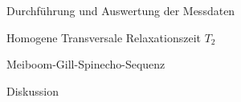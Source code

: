 \documentclass[pdftex, a4paper,11pt, twoside, ngerman]{report}
\begin{document}
\begin{chapter}{Durchführung und Auswertung der Messdaten}
\begin{section}{
        Homogene Transversale Relaxationszeit $T_{2}$}
\begin{subsection}{Meiboom-Gill-Spinecho-Sequenz}
        
      \end{subsection}
      
    \end{section}
    
    
    
    \newpage
    \begin{section}{Diskussion}
      \label{chpAuswertungDiskussion}
      
      
      
    \end{section}
   
  \end{chapter}
  
  
  
  
  
  
  
  \begin{thebibliography}{99}
    \scriptsize
    
  \end{thebibliography}
 
\end{document}
